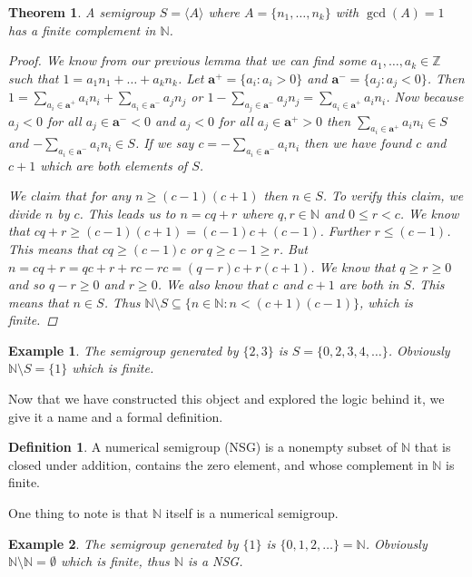 \documentclass[11pt]{amsart}
\theoremstyle{plain}
\newtheorem{thm}{Theorem}
\newtheorem{exa}{Example}
\theoremstyle{definition}
\newtheorem{defi}{Definition}
\begin{document}
\begin{thm}
A semigroup $S=\langle A\rangle$ where $A=\{n_1,\dots,n_k\}$ with $\gcd(A)=1$ has a finite complement in $\mathbb{N}$.
\begin{proof}
We know from our previous lemma that we can find some $a_1,\dots,a_k\in \mathbb{Z}$ such that $1=a_1n_1+\dots+a_kn_k$.
Let $\mathbf{a^+}=\{a_i:a_i>0\}$ and $\mathbf{a^-}=\{a_j:a_j<0\}$.
Then $1=\sum\limits_{a_i\in\mathbf{a^+}}{a_in_i}+\sum\limits_{a_i\in\mathbf{a^-}}{a_jn_j}$ or $1-\sum\limits_{a_j\in\mathbf{a^-}}
{a_jn_j}=\sum\limits_{a_i\in\mathbf{a^+}}{a_in_i}$. Now because $a_j<0$ for all
$a_j\in \mathbf{a^-}<0$ and $a_j<0$ for all $a_j\in \mathbf{a^+}>0$ then $\sum\limits_{a_i\in\mathbf{a^+}}
{a_in_i}\in S$ and $-\sum\limits_{a_i\in\mathbf{a^-}}{a_in_i}\in
S$. If we say $c=-\sum\limits_{a_i\in\mathbf{a^-}}{a_in_i}$
then we have found $c$ and $c+1$ which are both elements of $S$.

We claim that for any $n\ge (c-1)(c+1)$ then $n\in S$. To verify
this claim, we divide $n$ by $c$. This leads us to $n=cq+r$ where
$q,r\in \mathbb{N}$ and $0\le r<c$. We know that $cq+r\ge(c-1)(c+1)=(c-1)c+(c-1)$.
Further $r\le (c-1)$. This means that $cq\ge (c-1)c$ or $q\ge c-1\ge r$. But
$n=cq+r=qc+r+rc-rc=(q-r)c+r(c+1)$. We know that $q\ge r\ge 0$ and so $q-r\ge 0$
and $r\ge 0$. We also know that $c$ and $c+1$ are both in $S$.
This means that $n\in S$. Thus
$\mathbb{N}\setminus S \subseteq\{n\in \mathbb{N}:n<(c+1)(c-1)\}$, which is
finite.

\end{proof}
\end{thm}
\begin{exa}
  The semigroup generated by $\{2,3\}$ is $S=\{0,2,3,4,\dots \}$. Obviously
  $\mathbb{N}\setminus S=\{1\}$ which is finite.
\end{exa}
Now that we have constructed this object and explored the logic behind it, we give it a name and a formal definition.
\begin{defi}\cite{rosales}
  A numerical semigroup (NSG) is a nonempty subset of $\mathbb{N}$ that is closed
under addition, contains the zero element, and whose complement in $\mathbb{N}$
is finite.
\end{defi}
One thing to note is that $\mathbb{N}$ itself is a numerical semigroup.
\begin{exa}
  The semigroup generated by $\{1\}$ is $\{0,1,2,\dots \}=\mathbb{N}$. Obviously
  $\mathbb{N}\setminus \mathbb{N}=\emptyset$ which is finite, thus $\mathbb{N}$
  is a NSG.
\end{exa}
\end{document}
